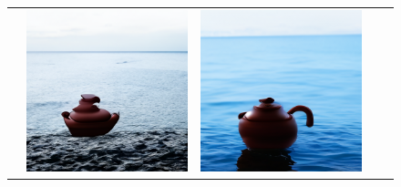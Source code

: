 \begin{figure}[!ht]
\scriptsize
    \centering
    \def\xwidth{0.135\linewidth}
    \setlength{\tabcolsep}{0.5pt}
    \begin{tabular}[t]{c c c c c}
    &
    \includegraphics[width=\xwidth]{cp2/figures/dreambooth/teapot/c96_checkpoint_599.png} &
    \includegraphics[width=\xwidth]{cp2/figures/dreambooth/teapot/c128_checkpoint_199.png} &

\end{tabular}
\end{figure}
